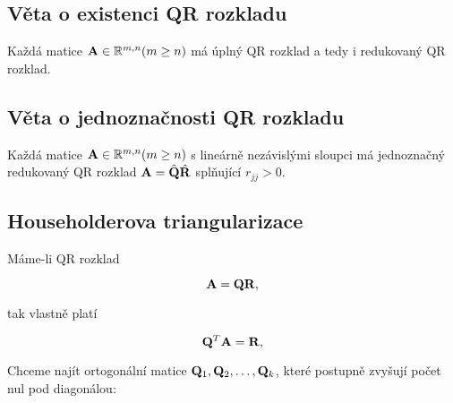 \subsection*{Věta o existenci QR rozkladu}

Každá matice $\mathbf{A} \in \mathbb{R}^{m,n} (m \ge n)$ má úplný QR rozklad a tedy i
redukovaný QR rozklad.

\subsection*{Věta o jednoznačnosti QR rozkladu}

Každá matice $\mathbf{A} \in \mathbb{R}^{m,n} (m \ge n)$ s lineárně nezávislými sloupci má
jednoznačný redukovaný QR rozklad $\mathbf{A}=\hat{\mathbf{Q}}\hat{\mathbf{R}}$ splňující $r_{jj} >
	0$.

\subsection*{Householderova triangularizace}

Máme-li QR rozklad

\[ \mathbf{A} = \mathbf{Q}\mathbf{R}, \]

\noindent tak vlastně platí

\[ \mathbf{Q}^T \mathbf{A} = \mathbf{R}, \]

\noindent Chceme najít ortogonální matice $\mathbf{Q}_1, \mathbf{Q}_2, \ldots, \mathbf{Q}_k$, které postupně zvyšují počet nul pod diagonálou:

